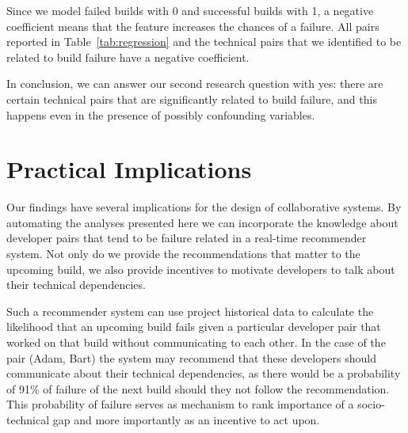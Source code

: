 Since we model failed builds with 0 and successful builds with 1, a negative coefficient means that the feature increases the chances of a failure.
All pairs reported in Table~\ref{tab:regression} and the technical pairs that we identified to be related to build failure have a negative coefficient.
 

In conclusion, we can answer our second research question with yes: there are
certain technical pairs that are significantly related to build failure, and
this happens even in the presence of possibly confounding variables. 







%







\section{Practical Implications}
\label{sec:implications}
Our findings have several implications for the design of collaborative systems.
By automating the analyses presented here we can incorporate the knowledge about
developer pairs that tend to be failure related in a real-time recommender
system. Not only do we provide the recommendations that matter to the upcoming
build, we also provide incentives to motivate developers to talk about their
technical dependencies. 

Such a recommender system can use project historical data to
calculate the likelihood that an upcoming build fails given a particular
developer pair that worked on that build without communicating to each other. In
the case of the pair (Adam, Bart) the system may recommend that these
developers should communicate about their technical dependencies, as there
would be a probability
of 91\% of failure of the next build should they not follow the
recommendation. This probability of failure serves as mechanism to
rank importance of a socio-technical gap and more importantly as an
incentive to act upon.

